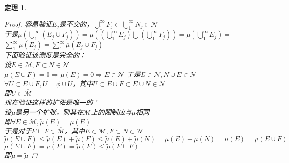\documentclass[12pt, a4paper, oneside]{ctexbook}
\newtheorem{theorem}{定理}[section]
\begin{document}
\begin{theorem}
\begin{proof}
        容易验证$E_j$是不交的，$\bigcup_1^{\infty}F_j\subset\bigcup_1^{\infty}N_j\in\mathcal{N}$\\
        于是$\overline{\mu}(\bigcup_1^{\infty}(E_j\cup F_j))=\overline{\mu}((\bigcup_1^{\infty}E_j)\bigcup(\bigcup_1^{\infty}F_j))=\mu(\bigcup_1^{\infty}E_j)=$\\
        $\sum_1^{\infty}\mu(E_j)=\sum_1^{\infty}\overline{\mu}(E_j\cup F_j)$\\
        下面验证该测度是完全的：\\
        设$E\in\mathcal{M},F\subset N\in\mathcal{N}$\\
        $\overline{\mu}(E\cup F)=0\Rightarrow\mu(E)=0\Rightarrow E\in\mathcal{N}$ 于是$E\in\mathcal{N},N\cup E\in\mathcal{N}$\\
        $\forall U\subset E\cup F,U=\phi\cup U$，其中$U\subset E\cup F\subset E\cup N\in\mathcal{N}$\\
        即$U\in\overline{\mathcal{M}}$\\
        现在验证这样的扩张是唯一的：\\
        设$\widetilde{\mu}$是另一个扩张，则其在$\mathcal{M}$上的限制应与$\mu$相同\\
        即$\forall E\in\mathcal{M},\widetilde{\mu}(E)=\mu(E)$\\
        于是对于$E\cup F\in\overline{\mathcal{M}}$，其中$E\in\mathcal{M},F\subset N\in\mathcal{N}$\\
        $\widetilde{\mu}(E\cup F)\leq\widetilde{\mu}(E)+\widetilde{\mu}(F)\leq\widetilde{\mu}(E)+\widetilde{\mu}(N)=\mu(E)+\mu(N)=\mu(E)=\overline{\mu}(E\cup F)$
        $\overline{\mu}(E\cup F)=\mu(E)=\widetilde{\mu}(E)\leq\widetilde{\mu}(E\cup F)$\\
        即$\overline{\mu}=\widetilde{\mu}$
    \end{proof}
\end{theorem}
\end{document}
